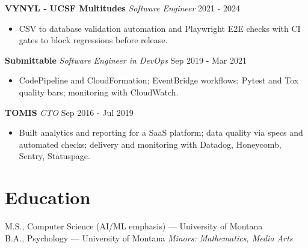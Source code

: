 \documentclass[10pt]{article}
\begin{document}
\noindent\textbf{VYNYL - UCSF Multitudes} \textit{Software Engineer}  \hfill 2021 - 2024\par
\begin{itemize}
  \item CSV to database validation automation and Playwright E2E checks with CI gates to block regressions before release.
\end{itemize}

\noindent\textbf{Submittable} \textit{Software Engineer in DevOps} \hfill Sep 2019 - Mar 2021\par
\begin{itemize}
  \item CodePipeline and CloudFormation; EventBridge workflows; Pytest and Tox quality bars; monitoring with CloudWatch.
\end{itemize}

\noindent\textbf{TOMIS} \textit{CTO} \hfill Sep 2016 - Jul 2019\par
\begin{itemize}
  \item Built analytics and reporting for a SaaS platform; data quality via specs and automated checks; delivery and monitoring with Datadog, Honeycomb, Sentry, Statuspage.
\end{itemize}

\section*{Education}
M.S., Computer Science (AI/ML emphasis) — University of Montana \\
B.A., Psychology — University of Montana \quad \emph{Minors: Mathematics, Media Arts}
\end{document}
